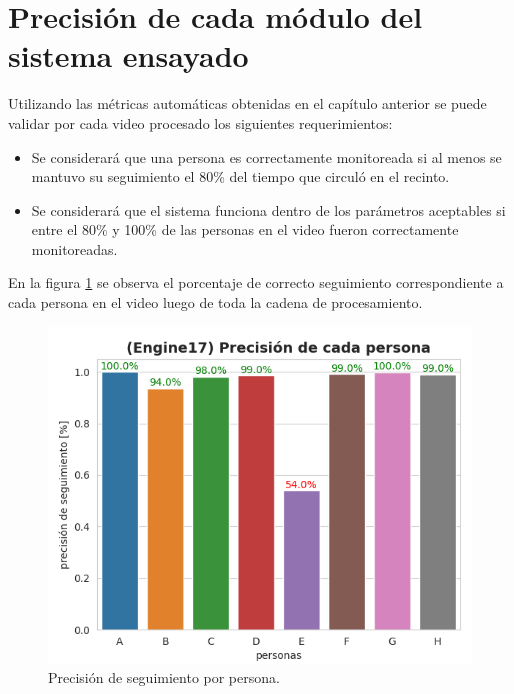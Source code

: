 \newpage


\section{Precisión de cada módulo del sistema ensayado}
\label{sec:precisionSistema}

Utilizando las métricas automáticas obtenidas en el capítulo anterior se puede validar por cada video procesado los siguientes requerimientos:
\begin{itemize}
\item Se considerará que una persona es correctamente monitoreada si al menos se mantuvo su seguimiento el 80\% del tiempo que circuló en el recinto.
\item Se considerará que el sistema funciona dentro de los parámetros aceptables si entre el 80\% y 100\% de las personas en el video fueron correctamente monitoreadas.
\end{itemize}

En la figura \ref{fig:metricasPorPersona} se observa el porcentaje de correcto seguimiento correspondiente a cada persona en el video luego de toda la cadena de procesamiento.

\begin{figure}[ht]
	\centering
	\includegraphics[scale=.80]{./Figures/metricasPorPersona.png}
	\caption{Precisión de seguimiento por persona.}
	\label{fig:metricasPorPersona}
\end{figure}

